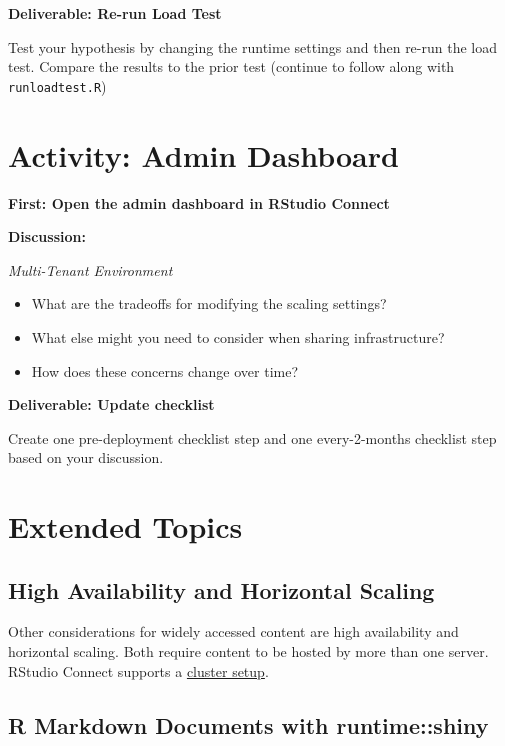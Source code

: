 \documentclass[]{book}
\providecommand{\tightlist}{%
  \setlength{\itemsep}{0pt}\setlength{\parskip}{0pt}}
\theoremstyle{definition}
\theoremstyle{definition}
\theoremstyle{definition}
\theoremstyle{remark}
\begin{document}
\textbf{Deliverable: Re-run Load Test}

Test your hypothesis by changing the runtime settings and then re-run
the load test. Compare the results to the prior test (continue to follow
along with \texttt{runloadtest.R})

\hypertarget{activity-admin-dashboard}{%
\section{Activity: Admin Dashboard}\label{activity-admin-dashboard}}

\textbf{First: Open the admin dashboard in RStudio Connect}

\textbf{Discussion:}

\emph{Multi-Tenant Environment}

\begin{itemize}
\tightlist
\item
  What are the tradeoffs for modifying the scaling settings?
\item
  What else might you need to consider when sharing infrastructure?
\item
  How does these concerns change over time?
\end{itemize}

\textbf{Deliverable: Update checklist}

Create one pre-deployment checklist step and one every-2-months
checklist step based on your discussion.

\hypertarget{extended-topics-2}{%
\section{Extended Topics}\label{extended-topics-2}}

\hypertarget{high-availability-and-horizontal-scaling}{%
\subsection{High Availability and Horizontal
Scaling}\label{high-availability-and-horizontal-scaling}}

Other considerations for widely accessed content are high availability
and horizontal scaling. Both require content to be hosted by more than
one server. RStudio Connect supports a
\href{https://docs.rstudio.com/connect/admin/high-availability.html}{cluster
setup}.

\hypertarget{r-markdown-documents-with-runtimeshiny}{%
\subsection{R Markdown Documents with
runtime::shiny}\label{r-markdown-documents-with-runtimeshiny}}
\end{document}
